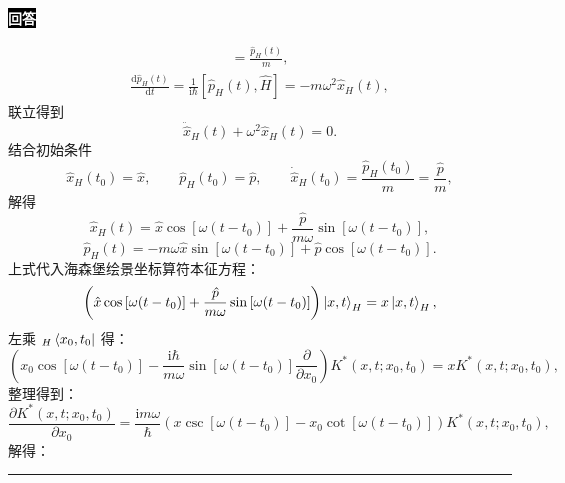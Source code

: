 \documentclass[11pt,a4paper]{ctexart}
\newenvironment{answer}
  {\par\smallskip\noindent
   \begingroup
   \setlength{\fboxsep}{4pt}%
   \colorbox{black}{\textcolor{white}{\bfseries 回答}}%
   \endgroup
   \quad\ignorespaces}
  {\par\smallskip\noindent\rule{\linewidth}{0.4pt}\medskip}
\begin{document}
\begin{answer}
\begin{enumerate}
\begin{equation}
\begin{aligned}
        =\frac{\hat{p}_H(t) }{m },
      \end{aligned}
    \end{equation}
    \begin{equation}
      \begin{aligned}
        \frac{\mathrm{d} \hat{p}_H(t)}{\mathrm{d}t }
        =\frac{1 }{\mathrm{i}\hbar }\left[\hat{p}_H(t),\hat{H} \right]
        =-m\omega^2 \hat{x}_H(t),
      \end{aligned}
    \end{equation}
    联立得到
    \begin{equation}
      \ddot{\hat{x}}_H(t)  + \omega^2 \hat{x}_H(t)
      =0.
    \end{equation}
    结合初始条件
    \begin{equation}
      \hat{x}_H(t_0)  = \hat{x},\qquad
      \hat{p}_H(t_0) = \hat{p},\qquad
      \dot{\hat{x}}_H(t_0) = \frac{\hat{p}_H(t_0) }{m } = \frac{\hat{p} }{m },
    \end{equation}
    解得
    \begin{equation}
      \hat{x}_H(t) = \hat{x} \cos \left[\omega(t-t_0) \right] + \frac{\hat{p} }{m\omega } \sin\left[\omega(t-t_0) \right],
    \end{equation}
    \begin{equation}
      \hat{p}_H(t) = -m\omega \hat{x} \sin\left[\omega(t-t_0) \right] + \hat{p} \cos\left[\omega(t-t_0) \right].
    \end{equation}
    上式代入海森堡绘景坐标算符本征方程：
    \begin{equation}
      \left(\hat{x} \cos \left[\omega(t-t_0) \right] + \frac{\hat{p} }{m\omega } \sin\left[\omega(t-t_0) \right] \right) \Ket{x,t }_H
      =x\Ket{x,t }_H,
    \end{equation}
    左乘 ${}_H\Bra{x_0,t_0 } $ 得：
    \begin{equation}
      \left(x_0\cos\left[\omega(t-t_0) \right] - \frac{\mathrm{i}\hbar }{m\omega }\sin\left[\omega(t-t_0) \right] \frac{\partial }{\partial x_0 }  \right) K^*(x,t;x_0,t_0)
      =x K^*(x,t;x_0,t_0),
    \end{equation}
    整理得到：
    \begin{equation}
      \frac{\partial K^*(x,t;x_0,t_0) }{\partial x_0 }
      =\frac{\mathrm{i}m\omega }{\hbar } \left(x\csc\left[\omega(t-t_0) \right] - x_0\cot\left[\omega(t-t_0) \right] \right) K^*(x,t;x_0,t_0),
    \end{equation}
    解得：
    \begin{equation}

\end{equation}
\end{enumerate}
\end{answer}
\end{document}
